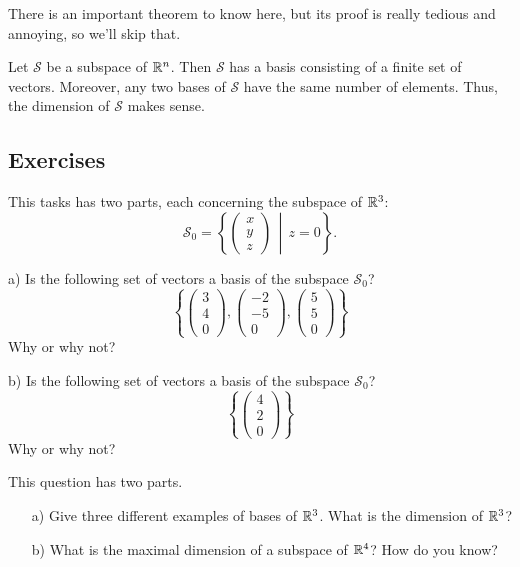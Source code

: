 \documentclass[elementsmain.tex]{subfiles}
\begin{document}
There is an important theorem to know here, but its proof is really tedious and annoying, so we'll skip that.

\begin{theorem}
Let $\mathcal{S}$ be a subspace of $\mathbb{R}^n$. Then $\mathcal{S}$ has a basis consisting of a finite set of vectors. Moreover, any two bases of $\mathcal{S}$ have the same number of elements. Thus, the dimension of $\mathcal{S}$ makes sense.
\end{theorem}


\clearpage
\subsection*{Exercises}

\begin{exercise} This tasks has two parts, each concerning the subspace of $\mathbb{R}^3$:
\[
\mathcal{S}_0 = \left\{ \begin{pmatrix} x \\ y \\ z \end{pmatrix} \,\middle|\, z=0 \right\}.
\]
\begin{compactitem}
\item[a)] Is the following set of vectors a basis of the subspace $\mathcal{S}_0$?
\[
\left\{ \begin{pmatrix} 3 \\ 4 \\ 0 \end{pmatrix}, \begin{pmatrix} -2 \\ -5 \\ 0\end{pmatrix}, \begin{pmatrix} 5 \\ 5 \\ 0\end{pmatrix} \right\}
\]
Why or why not?
\item[b)] Is the following set of vectors a basis of the subspace $\mathcal{S}_0$?
\[
\left\{ \begin{pmatrix} 4 \\ 2 \\ 0 \end{pmatrix}\right\}
\]
Why or why not?
\end{compactitem}
\end{exercise}

\begin{exercise} This question has two parts. 
\begin{itemize}
\item[a)] Give three different examples of bases of $\mathbb{R}^3$. What is the dimension of $\mathbb{R}^3$?
\item[b)] What is the maximal dimension of a subspace of $\mathbb{R}^4$? How do you know?
\end{itemize}
\end{exercise}
\end{document}
